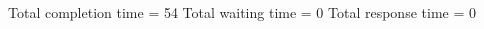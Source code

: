 \begin{RTGrid}[width=0.8\textwidth]{5}{20}
\end{RTGrid}\newline\newline
Total completion time = 54\newline
Total waiting time = 0\newline
Total response time = 0\newline
